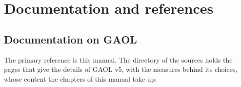 \chapter{Documentation and references}\label{chap:documentation}

\section{Documentation on GAOL}

The primary reference is this manual. The directory  of the sources
holds the pages that give the details of GAOL v5, with the measures behind
its choices, whose content the chapters of this manual take up:

